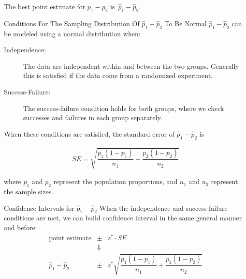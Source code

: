 \documentclass{beamer}
\begin{document}
\begin{frame}
  \begin{note}
    The best point estimate for $p_1-p_2$ is\pause~$\hat{p}_1-\hat{p}_2$.
  \end{note}\pause

  \begin{block}{\normalsize Conditions For The Sampling Distribution Of $\hat{p}_1-\hat{p}_2$ To Be Normal}
    $\hat{p}_1-\hat{p}_2$ can be modeled using a normal distribution when:\pause
    \begin{description}
    \item[Independence:] The data are independent within and between the two groups. Generally this is satisfied if the data come from a randomized experiment.\pause
    \item[Success-Failure:] The success-failure condition holds for both groups, where we check successes and failures in each group separately.\pause
    \end{description}

    When these conditions are satisfied, the standard error of $\hat{p}_1-\hat{p}_2$ is

    \vspace{-2mm}
    \begin{equation*}
      \begin{aligned}
        SE = \sqrt{\dfrac{p_1(1-p_1)}{n_1}+\dfrac{p_2(1-p_2)}{n_2}}
      \end{aligned}
    \end{equation*}

    \vspace{-1mm}
    where $p_1$ and $p_2$ represent the population proportions, and $n_1$ and $n_2$ represent the sample sizes.
  \end{block}
\end{frame}

\begin{frame}
  \begin{block}{Confidence Intervals for $\hat{p}_1-\hat{p}_2$}
    When the independence and success-failure conditions are met, we can build confidence interval in the same general manner and before:
    \begin{equation*}
      \begin{array}{rcl}
        \text{point estimate} & \pm & z^*\cdot SE \\
        &\Downarrow\\
        \hat{p}_1-\hat{p}_2 & \pm & z^*\sqrt{\dfrac{p_1(1-p_1)}{n_1}+\dfrac{p_2(1-p_2)}{n_2}}
      \end{array}
    \end{equation*}
  \end{block}
\end{frame}
\end{document}
